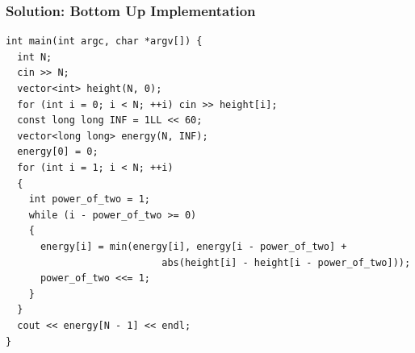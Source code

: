\documentclass{beamer}
\begin{document}
\begin{frame}[containsverbatim]
\frametitle{Solution: Bottom Up Implementation}

\scriptsize
\begin{lstlisting}
int main(int argc, char *argv[]) {
  int N;
  cin >> N;
  vector<int> height(N, 0);
  for (int i = 0; i < N; ++i) cin >> height[i];
  const long long INF = 1LL << 60;
  vector<long long> energy(N, INF);
  energy[0] = 0;
  for (int i = 1; i < N; ++i)
  {
    int power_of_two = 1;
    while (i - power_of_two >= 0)
    {
      energy[i] = min(energy[i], energy[i - power_of_two] +
                           abs(height[i] - height[i - power_of_two]));
      power_of_two <<= 1;
    }
  }
  cout << energy[N - 1] << endl;
}
\end{lstlisting}

\end{frame}

\fi
\end{document}
